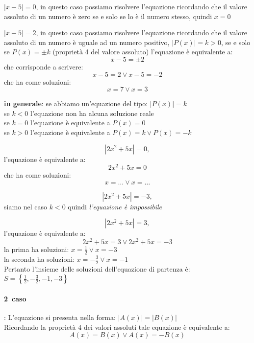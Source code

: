 \begin{esempio}  
$|x-5|=0$, in questo caso possiamo 
risolvere 
l'equazione ricordando che il valore assoluto di un numero è zero se e solo se 
lo è il numero stesso, quindi $x=0$
\end{esempio}

\begin{esempio}  
$|x-5|=2$, in  questo caso possiamo 
risolvere l'equazione ricordando che  il valore assoluto di un numero è uguale 
ad un numero positivo, $|P(x)|=k>0$, se e solo se $P(x)=\pm k$ (proprietà 4 del 
valore assoluto) l'equazione è equivalente a:
$$x-5=\pm 2$$
che corrisponde a scrivere:
$$x-5= 2 \vee x-5=-2$$
che ha come soluzioni:
$$x=7 \vee x=3$$
\end{esempio}

\textbf{in generale}: se abbiamo un'equazione del tipo: $|P(x)|=k$\\
se $k < 0$  l'equazione non ha alcuna soluzione reale\\
se $k = 0$  l'equazione è equivalente a  $P(x) = 0$\\
se $k > 0$   l'equazione è equivalente a  $P(x)=k \vee P(x)=-k$\\

\begin{esempio} 
$$|2x^2+5x|=0,$$ l'equazione è equivalente a:
$$2x^2+5x=0$$
che ha come soluzioni:
$$x=\dots \vee x=\dots$$
\end{esempio}

\begin{esempio} 
$$|2x^2+5x|=-3,$$ siamo nel caso $k < 0$ 
quindi \emph{l'equazione è impossibile}
\end{esempio}
        
\begin{esempio} 
$$|2x^2+5x|=3,$$ l'equazione è equivalente a:
$$2x^2+5x=3 \vee 2x^2+5x=-3$$
la prima ha soluzioni: $x=\frac{1}{2} \vee x=-3$\\
la seconda ha soluzioni: $x=-\frac{3}{2} \vee x=-1$\\
Pertanto l'insieme delle soluzioni dell'equazione di partenza è: 
$S=\left\lbrace \frac{1}{2},-\frac{3}{2},-1,-3\right\rbrace $
\end{esempio}

\paragraph{2\textdegree~caso}: L'equazione si presenta nella forma:  
$|A(x)|=|B(x)|$\\
Ricordando la proprietà 4 dei valori assoluti tale equazione è equivalente a:
$$A(x)=B(x) \vee A(x)=-B(x)$$

